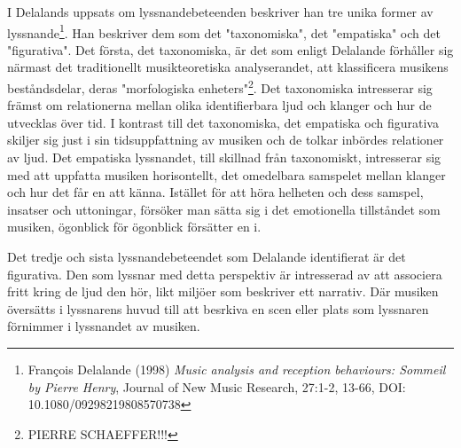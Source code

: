 \documentclass{article}
\begin{document}






I Delalands uppsats om lyssnandebeteenden beskriver han tre unika former av lyssnande\footnote{François
Delalande (1998) \emph{Music analysis and reception behaviours: Sommeil by Pierre Henry}, Journal of New Music
Research, 27:1-2, 13-66, DOI: 10.1080/09298219808570738}. Han beskriver dem som det "taxonomiska", det
"empatiska" och det "figurativa". Det första, det taxonomiska, är det som enligt Delalande förhåller sig
närmast det traditionellt musikteoretiska analyserandet, att klassificera musikens beståndsdelar, deras
"morfologiska enheters"\footnote{PIERRE SCHAEFFER!!!}. Det taxonomiska intresserar sig främst om relationerna
mellan olika identifierbara ljud och klanger och hur de utvecklas över tid. I kontrast till det taxonomiska,
det empatiska och figurativa skiljer sig just i sin tidsuppfattning av musiken och de tolkar inbördes
relationer av ljud. Det empatiska lyssnandet, till skillnad från taxonomiskt, intresserar sig med att
uppfatta musiken horisontellt, det omedelbara samspelet mellan klanger och hur det får en att känna. Istället
för att höra helheten och dess samspel, insatser och uttoningar, försöker man sätta sig i det emotionella
tillståndet som musiken, ögonblick för ögonblick försätter en i. 


Det tredje och sista lyssnandebeteendet som
Delalande identifierat är det figurativa. Den som lyssnar med detta perspektiv är intresserad av att associera
fritt kring de ljud den hör, likt miljöer som beskriver ett narrativ. Där musiken översätts i lyssnarens huvud
till att besrkiva en scen eller plats som lyssnaren förnimmer i lyssnandet av musiken. 
\end{document}
